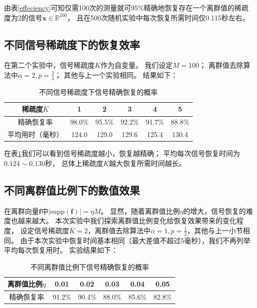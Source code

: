 \documentclass[AutoFakeBold]{LZUThesis}
\begin{document}
由表\ref{effeciency}可知仅需100次的测量就可95\%精确地恢复存在一个离群值的稀疏度为2的信号$\mathbf{x} \in \mathbb{R}^{200}$，
且在500次随机实验中每次恢复所需时间仅0.115秒左右。

\subsection{不同信号稀疏度下的恢复效率}

在第二个实验中，信号稀疏度$K$作为自变量。
我们设定$M = 100$；
离群值去除算法中$\alpha = 2, p = \frac{3}{4}$；
其他与上一个实验相同。
结果如下：

\begin{table}[H]
    \centering
    \caption{不同信号稀疏度下信号精确恢复的概率}
    \begin{tabular}{cccccc} %
        \toprule
        稀疏度$K$ & 1  & 2  & 3  & 4 & 5\\
        \toprule
        精确恢复率 & 98.0\% & 95.5\% & 92.2\%  & 91.7\% & 88.8\%\\
        \midrule
        平均用时（毫秒） & 124.0 & 129.0 & 129.6 &  125.4 & 130.4\\
        \bottomrule
    \end{tabular}
    \label{diff_sprs}
\end{table}

在表\ref{diff_sprs}我们可以看到信号稀疏度越小，恢复越精确；
平均每次信号恢复时间为$0.124 \sim 0.130$秒，
总体上稀疏度$K$越大恢复所需时间越长。

\subsection{不同离群值比例下的数值效果}

在离群向量$\mathbf{f}$中$\left | \mathrm{supp} (\mathbf{f}) \right | = \eta M$。
显然，随着离群值比例$\eta$的增大，信号恢复的难度也越来越大。
本次实验中我们探索离群值比例变化给恢复效果带来的变化程度，
设定信号稀疏度$K = 2$，离群值去除算法中$\alpha = 1, p = \frac{1}{2}$，其他与上一小节相同。
由于本次实验中恢复时间基本相同（最大差值不超过5毫秒），我们不再列举平均每次恢复用时。
实验结果如下：

\begin{table}[H]
    \centering
    \caption{不同离群值比例下信号精确恢复的概率}
    \begin{tabular}{cccccc} %
        \toprule
        离群值比例$\eta$ & 0.01  & 0.02  & 0.03  & 0.04 & 0.05\\
        \toprule
        精确恢复率 & 91.2\% & 90.4\% & 88.0\%  & 85.6\% & 82.8\%\\
        \bottomrule
    \end{tabular}
    \label{diff_eta}
\end{table}
\end{document}
